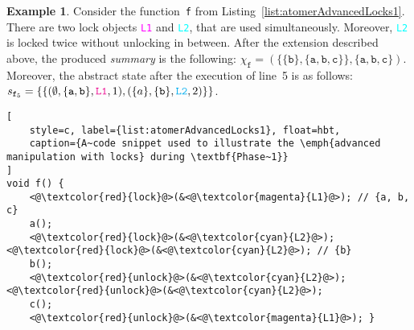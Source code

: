\documentclass{ExcelAtFIT}
\theoremstyle{definition}
\newtheorem{example}{Example}[section]
\begin{document}
\begin{example}
    Consider the function~\texttt{f} from Listing~\ref{list:atomerAdvancedLocks1}. There are two lock objects \textcolor{magenta}{\texttt{L1}} and \textcolor{cyan}{\texttt{L2}}, that are used simultaneously. Moreover, \textcolor{cyan}{\texttt{L2}} is locked twice without unlocking in between. After the extension described above, the produced \emph{summary} is the following: $ \chi_\mathtt{f} = ({\{\{\mathtt{b}\}, \{\mathtt{a}, \mathtt{b}, \mathtt{c}\}\}}, {\{\mathtt{a}, \mathtt{b}, \mathtt{c}\}}) $. Moreover, the abstract state after the execution of line~5 is as follows: $ s_{\mathtt{f}_5} = \{\{{(\emptyset, \{\mathtt{a, b}\}, \textcolor{magenta}{\mathtt{L1}}, 1)}, {(\{a\}, \{\mathtt{b}\}, \textcolor{cyan}{\mathtt{L2}}, 2)}\}\} $.
\end{example}

\begin{lstlisting}[
    style=c, label={list:atomerAdvancedLocks1}, float=hbt,
    caption={A~code snippet used to illustrate the \emph{advanced manipulation with locks} during \textbf{Phase~1}}
]
void f() {
    <@\textcolor{red}{lock}@>(&<@\textcolor{magenta}{L1}@>); // {a, b, c}
    a();
    <@\textcolor{red}{lock}@>(&<@\textcolor{cyan}{L2}@>); <@\textcolor{red}{lock}@>(&<@\textcolor{cyan}{L2}@>); // {b}
    b();
    <@\textcolor{red}{unlock}@>(&<@\textcolor{cyan}{L2}@>); <@\textcolor{red}{unlock}@>(&<@\textcolor{cyan}{L2}@>);
    c();
    <@\textcolor{red}{unlock}@>(&<@\textcolor{magenta}{L1}@>); }
\end{lstlisting}
\end{document}
